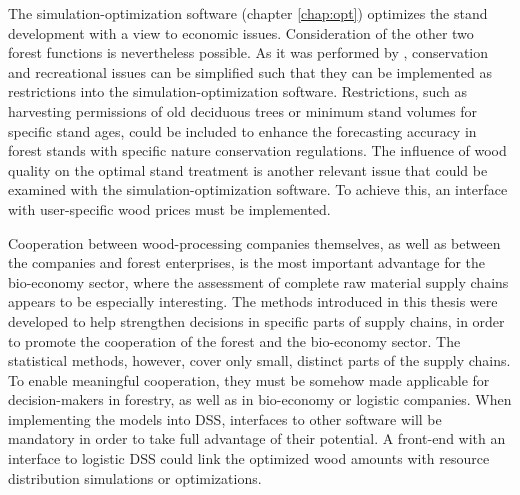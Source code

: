 The si\-mu\-la\-tion-op\-ti\-mi\-za\-tion software (chapter \ref{chap:opt}) optimizes the stand development with a view to economic issues. Consideration of the other two forest functions is nevertheless possible. As it was performed by \citet{yousefpour_2009}, conservation and recreational issues can be simplified such that they can be implemented as restrictions into the si\-mu\-la\-tion-op\-ti\-mi\-za\-tion software. Restrictions, such as harvesting permissions of old deciduous trees or minimum stand volumes for specific stand ages, could be included to enhance the forecasting accuracy in forest stands with specific nature conservation regulations. The influence of wood quality on the optimal stand treatment is another relevant issue that could be examined with the si\-mu\-la\-tion-op\-ti\-mi\-za\-tion software. To achieve this, an interface with user-specific wood prices must be implemented.

Cooperation between wood-processing companies themselves, as well as between the companies and forest enterprises, is the most important advantage for the bio-economy sector, where the assessment of complete raw material supply chains appears to be especially interesting. The methods introduced in this thesis were developed to help strengthen decisions in specific parts of supply chains, in order to promote the cooperation of the forest and the bio-economy sector. The statistical methods, however, cover only small, distinct parts of the supply chains. To enable meaningful cooperation, they must be somehow made applicable for decision-makers in forestry, as well as in bio-economy or logistic companies. When implementing the models into DSS, interfaces to other software will be mandatory in order to take full advantage of their potential. A front-end with an interface to logistic DSS could link the optimized wood amounts with resource distribution simulations or optimizations.